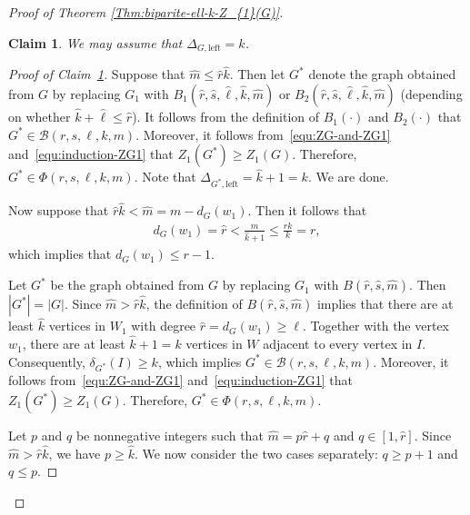 \documentclass[11pt,a4paper]{article}
\newtheorem{claim}[definition]{Claim}
\begin{document}
\begin{proof}[Proof of Theorem \ref{Thm:biparite-ell-k-Z_{1}(G)}]
    \begin{claim}\label{THM-bi-degree-du1}
        We may assume that $\Delta_{G, \mathrm{left}} = k$. 
    \end{claim}
    
    \begin{proof}[Proof of Claim~\ref{THM-bi-degree-du1}]
        Suppose that $\hat{m} \le \hat{r} \hat{k}$. 
        Then let $G^{\ast}$ denote the graph obtained from $G$ by replacing $G_1$ with $B_1(\hat{r}, \hat{s}, \hat{\ell}, \hat{k}, \hat{m})$ or $B_2(\hat{r}, \hat{s}, \hat{\ell}, \hat{k}, \hat{m})$ (depending on whether $\hat{k} + \hat{\ell} \le \hat{r}$).
        It follows from the definition of $B_1(\cdot)$ and $B_{2}(\cdot)$ that $G^{\ast} \in \mathcal{B}(r, s, \ell, k, m)$. 
        Moreover, it follows from~\eqref{equ:ZG-and-ZG1} and~\eqref{equ:induction-ZG1} that $Z_{1}(G^{\ast}) \ge Z_{1}(G)$. 
        Therefore, $G^{\ast} \in \Phi(r,s,\ell,k,m)$. 
        Note that $\Delta_{G^{\ast}, \mathrm{left}} = \hat{k} +1 =k$. 
        We are done. 

        Now suppose that $\hat{r} \hat{k} < \hat{m} = m-d_{G}(w_1)$. 
        Then it follows that 
        \begin{align*}
            d_{G}(w_1)
            = \hat{r}
            < \frac{m}{\hat{k}+1}
            \le \frac{rk}{k}
            = r, 
        \end{align*}
        which implies that $d_{G}(w_1) \le r-1$. 
        
        Let $G^{\ast}$ be the graph obtained from $G$ by replacing $G_1$ with $B(\hat{r}, \hat{s}, \hat{m})$. 
        Then $|G^{\ast}| = |G|$. 
        Since $\hat{m} > \hat{r}\hat{k}$, the definition of $B(\hat{r}, \hat{s}, \hat{m})$ implies that there are at least $\hat{k}$ vertices in $W_1$ with degree $\hat{r} = d_{G}(w_1) \ge \ell$. 
        Together with the vertex $w_1$, there are at least $\hat{k} + 1 = k$ vertices in $W$ adjacent to every vertex in $I$. 
        Consequently, $\delta_{G^{\ast}}(I) \ge k$, which implies $G^{\ast} \in \mathcal{B}(r,s,\ell,k,m)$. 
        Moreover, it follows from~\eqref{equ:ZG-and-ZG1} and~\eqref{equ:induction-ZG1} that $Z_{1}(G^{\ast}) \ge Z_{1}(G)$. 
        Therefore, $G^{\ast} \in \Phi(r,s,\ell,k,m)$. 
        
        Let $p$ and $q$ be nonnegative integers such that $\hat{m} = p \hat{r} + q$ and $q \in [1, \hat{r}]$. 
        Since $\hat{m} > \hat{r} \hat{k}$, we have $p \ge \hat{k}$. 
        We now consider the two cases separately: $q \ge p+1$ and $q \le p$.         


\end{proof}
\end{proof}
\end{document}
